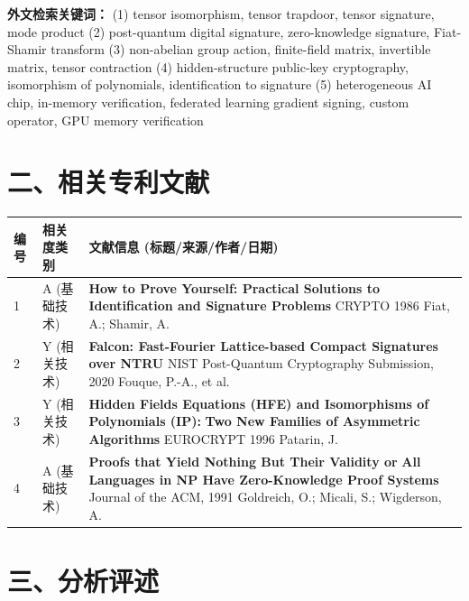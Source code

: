 \documentclass[12pt,a4paper]{article}
\begin{document}
\textbf{外文检索关键词：}
(1) tensor isomorphism, tensor trapdoor, tensor signature, mode product
(2) post-quantum digital signature, zero-knowledge signature, Fiat-Shamir transform
(3) non-abelian group action, finite-field matrix, invertible matrix, tensor contraction
(4) hidden-structure public-key cryptography, isomorphism of polynomials, identification to signature
(5) heterogeneous AI chip, in-memory verification, federated learning gradient signing, custom operator, GPU memory verification

\section*{二、相关专利文献}

\renewcommand{\arraystretch}{1.5}
\begin{longtable}{|p{1.5cm}|p{6cm}|p{7.5cm}|}
\hline
\textbf{编号} & \textbf{相关度类别} & \textbf{文献信息 (标题/来源/作者/日期)} \\
\hline
1 & A (基础技术) & \textbf{How to Prove Yourself: Practical Solutions to Identification and Signature Problems} \newline CRYPTO 1986 \newline Fiat, A.; Shamir, A. \\
\hline
2 & Y (相关技术) & \textbf{Falcon: Fast-Fourier Lattice-based Compact Signatures over NTRU} \newline NIST Post-Quantum Cryptography Submission, 2020 \newline Fouque, P.-A., et al. \\
\hline
3 & Y (相关技术) & \textbf{Hidden Fields Equations (HFE) and Isomorphisms of Polynomials (IP):} \newline \textbf{Two New Families of Asymmetric Algorithms} \newline EUROCRYPT 1996 \newline Patarin, J. \\
\hline
4 & A (基础技术) & \textbf{Proofs that Yield Nothing But Their Validity or} \newline \textbf{All Languages in NP Have Zero-Knowledge Proof Systems} \newline Journal of the ACM, 1991 \newline Goldreich, O.; Micali, S.; Wigderson, A. \\
\hline
\end{longtable}

\section*{三、分析评述}
\end{document}
